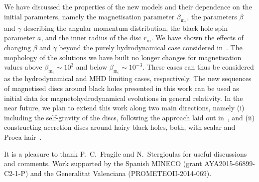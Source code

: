 \documentclass[referee]{aa}
\begin{document}
We have discussed the properties of the new models and their dependence on the initial parameters, namely the magnetisation parameter $\beta_{\mathrm{m}_{\mathrm{c}}}$, the parameters $\beta$ and $\gamma$ describing the angular momentum distribution, the black hole spin parameter $a$, and the inner radius of the disc $r_{\mathrm{in}}$. We have shown the effects of changing $\beta$ and $\gamma$ beyond the purely hydrodynamical case considered in~\citet{Qian:2009}. The mophology of the solutions we have built no longer changes for magnetisation values above $\beta_{\mathrm{m}_{\mathrm{c}}} \sim 10^{3}$ and below $\beta_{\mathrm{m}_{\mathrm{c}}} \sim 10^{-3}$. These cases can thus be considered as the hydrodynamical and MHD limiting cases, respectively. The new sequences of magnetised discs around black holes presented in this work can be used as initial data for magnetohydrodynamical evolutions in general relativity. In the near future, we plan to extend this work along two main directions, namely (i) including the self-gravity of the discs, following the approach laid out in~\citet{Stergioulas:2011}, and (ii) constructing accretion discs around hairy black holes, both, with scalar and Proca hair~\citep{Herdeiro:2014,Herdeiro:2016}.

\begin{acknowledgements}
It is a pleasure to thank P.~C.~Fragile and N.~Stergioulas for useful discussions and comments. Work supported by the Spanish MINECO (grant AYA2015-66899-C2-1-P) and the Generalitat Valenciana (PROMETEOII-2014-069).
\end{acknowledgements}



\end{document}
